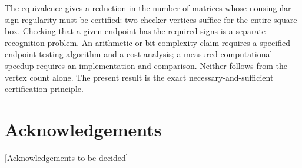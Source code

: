 \documentclass[11pt]{article}
\theoremstyle{definition}
\theoremstyle{remark}
\numberwithin{equation}{section}
\begin{document}
The equivalence gives a reduction in the number of matrices
whose nonsingular sign regularity must be certified: two
checker vertices suffice for the entire square box. Checking
that a given endpoint has the required signs is a separate
recognition problem. An arithmetic or bit-complexity claim
requires a specified endpoint-testing algorithm and a cost
analysis; a measured computational speedup requires an
implementation and comparison. Neither follows from the
vertex count alone. The present result is the exact
necessary-and-sufficient certification principle.

\section*{Acknowledgements}
[Acknowledgements to be decided]



\end{document}
